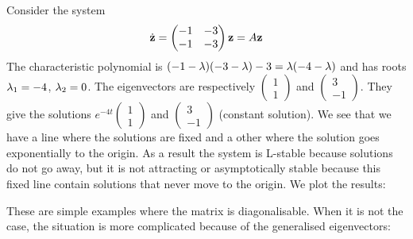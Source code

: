 \begin{exemple}
Consider the system
$$ \dot{\mathbf{z}}=
\begin{pmatrix} -1&-3\\-1&-3 \end{pmatrix}\mathbf{z} =A\mathbf{z}
$$
The characteristic polynomial is $(-1-\lambda)(-3-\lambda)-3=\lambda(-4-\lambda)$ and has roots $\lambda_1=-4$, $\lambda_2=0$. The eigenvectors are respectively $\begin{pmatrix}1\\1\end{pmatrix}$ and 
$\begin{pmatrix}3\\-1\end{pmatrix}$. They give the solutions $e^{-4t}\begin{pmatrix}1\\1\end{pmatrix}$ and $\begin{pmatrix}3\\-1\end{pmatrix}$ (constant solution). 
We see that we have a line where the solutions are fixed and a other where the solution goes exponentially to the origin. As a result the system is L-stable because solutions do not go away, but it is not attracting or asymptotically stable because this fixed line contain solutions that never move to the origin.
We plot the results: 
\end{exemple}
These are simple examples where the matrix is diagonalisable. When it is not the case, the situation is more complicated because of the generalised eigenvectors:

